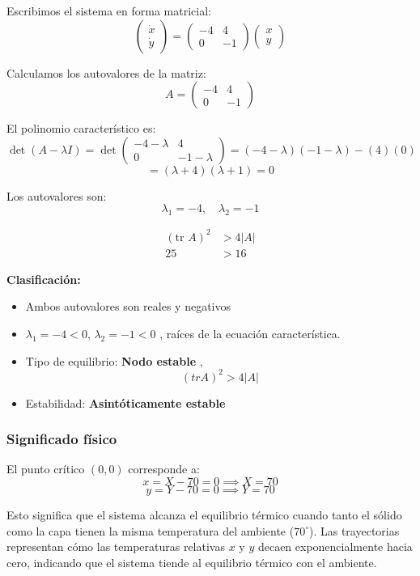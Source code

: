 \documentclass[a4paper,10pt]{article}
\begin{document}
Escribimos el sistema en forma matricial:
\[
\begin{pmatrix}
\dot{x} \\ \dot{y}
\end{pmatrix}
=
\begin{pmatrix}
-4 & 4 \\
0 & -1
\end{pmatrix}
\begin{pmatrix}
x \\ y
\end{pmatrix}
\]

Calculamos los autovalores de la matriz:
\[
A = \begin{pmatrix}
-4 & 4 \\
0 & -1
\end{pmatrix}
\]

El polinomio característico es:
\[
\det(A - \lambda I) = \det\begin{pmatrix}
-4-\lambda & 4 \\
0 & -1-\lambda
\end{pmatrix} = (-4-\lambda)(-1-\lambda) - (4)(0)
\]
\[
= (\lambda + 4)(\lambda + 1) = 0
\]

Los autovalores son:
\[
\lambda_1 = -4, \quad \lambda_2 = -1
\]

\begin{align}
	(\text{tr } A)^{2} &> 4 |A| \\
	25 &> 16
\end{align}

	\textbf{Clasificación:}
\begin{itemize}
	\item Ambos autovalores son reales y negativos
	\item $\lambda_1 = -4 < 0$, $\lambda_2 = -1 < 0$ , raíces de la ecuación característica.
	\item Tipo de equilibrio: \textbf{Nodo estable} , \[(tr A)^2 > 4 |A| \]
	\item Estabilidad: \textbf{Asintóticamente estable}
\end{itemize}

\subsubsection*{Significado físico}

El punto crítico $(0, 0)$ corresponde a:
\[
x = X - 70 = 0 \implies X = 70
\]
\[
y = Y - 70 = 0 \implies Y = 70
\]

Esto significa que el sistema alcanza el equilibrio térmico cuando tanto el sólido como la capa tienen la misma temperatura del ambiente ($70^\circ$). Las trayectorias representan cómo las temperaturas relativas $x$ y $y$ decaen exponencialmente hacia cero, indicando que el sistema tiende al equilibrio térmico con el ambiente.
\end{document}
